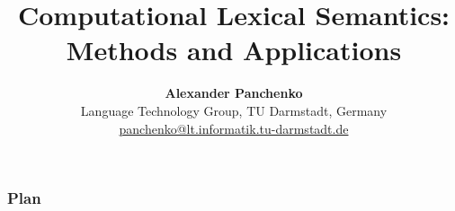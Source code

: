 \documentclass{beamer}
\title[\insertframenumber/\inserttotalframenumber]
{\textbf{Computational Lexical Semantics: \\ Methods and Applications }}
\subtitle{}
\author[Alexander Panchenko]
{\textbf{Alexander Panchenko} \\ Language Technology Group, TU Darmstadt, Germany   \\ { \url{panchenko@lt.informatik.tu-darmstadt.de}  }}
\begin{document}
\begin{frame}
  \titlepage
\end{frame}

\begin{frame}
  \setcounter{tocdepth}{1}
  \frametitle{Plan}
  \tableofcontents
  \setcounter{tocdepth}{2}
\end{frame}









%
%
%
%
\end{document}
